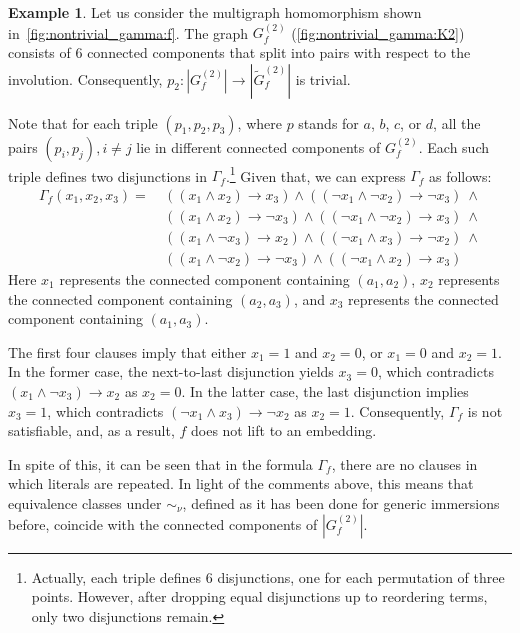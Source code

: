 \documentclass[a4paper,12pt,reqno,oneside]{amsart}
\theoremstyle{plain}
\theoremstyle{definition}
\newtheorem{example}{Example}
\theoremstyle{plain}
\newcommand{\from}{\colon}
\newcommand{\wt}[1]{\widetilde{#1}}
\begin{document}
\begin{example}\label{ex:nontrivial_gamma}
  Let us consider the multigraph homomorphism shown in~\cref{fig:nontrivial_gamma:f}. The graph
  $G^{(2)}_f$ (\cref{fig:nontrivial_gamma:K2}) consists of 6 connected components that split into
  pairs with respect to the involution. Consequently, $p_2 \from |G^{(2)}_f| \to |\wt{G}^{(2)}_f|$
  is trivial.

  Note that for each triple $(p_1, p_2, p_3)$, where $p$ stands for $a$, $b$, $c$, or $d$, all the
  pairs $(p_i, p_j), i \neq j$ lie in different connected components of $G^{(2)}_f$. Each such
  triple defines two disjunctions in $\Gamma_f$.\footnote{Actually, each triple defines 6
    disjunctions, one for each permutation of three points. However, after dropping equal
    disjunctions up to reordering terms, only two disjunctions remain.} Given that, we can express
  $\Gamma_f$ as follows:
  \[
    \begin{aligned}
      \Gamma_f(x_1, x_2, x_3) =\ &((x_1 \wedge x_2) \to x_3) \wedge ((\neg x_1 \wedge \neg x_2) \to \neg x_3)\ \wedge \\
                              &((x_1 \wedge x_2) \to \neg x_3) \wedge ((\neg x_1 \wedge \neg x_2) \to x_3)\ \wedge \\
                              &((x_1 \wedge \neg x_3) \to x_2) \wedge ((\neg x_1 \wedge x_3) \to \neg x_2)\ \wedge \\
                              &((x_1 \wedge \neg x_2) \to \neg x_3) \wedge ((\neg x_1 \wedge x_2) \to x_3)
    \end{aligned}
  \]
  Here $x_1$ represents the connected component containing $(a_1, a_2)$, $x_2$ represents the
  connected component containing $(a_2, a_3)$, and $x_3$ represents the connected component containing $(a_1, a_3)$.

  The first four clauses imply that either $x_1 = 1$ and $x_2 = 0$, or $x_1 = 0$ and $x_2 = 1$. In
  the former case, the next-to-last disjunction yields $x_3 = 0$, which contradicts
  $(x_1 \wedge \neg x_3) \to x_2$ as $x_2 = 0$. In the latter case, the last disjunction implies
  $x_3 = 1$, which contradicts $(\neg x_1 \wedge x_3) \to \neg x_2$ as $x_2 = 1$. Consequently,
  $\Gamma_f$ is not satisfiable, and, as a result, $f$ does not lift to an embedding.

  In spite of this, it can be seen that in the formula $\Gamma_f$, there are no clauses in which
  literals are repeated. In light of the comments above, this means that equivalence classes under
  $\sim_\nu$, defined as it has been done for generic immersions before, coincide with the connected
  components of $|G^{(2)}_f|$.
\end{example}
\end{document}
